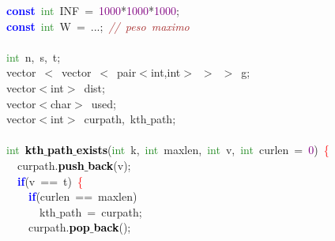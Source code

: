 {\ttfamily \raggedright {
\noindent
\mbox{}\textbf{\textcolor{Blue}{const}}\ \textcolor{ForestGreen}{int}\ INF\ \textcolor{BrickRed}{=}\ \textcolor{Purple}{1000}\textcolor{BrickRed}{*}\textcolor{Purple}{1000}\textcolor{BrickRed}{*}\textcolor{Purple}{1000}\textcolor{BrickRed}{;} \\
\mbox{}\textbf{\textcolor{Blue}{const}}\ \textcolor{ForestGreen}{int}\ W\ \textcolor{BrickRed}{=}\ \textcolor{BrickRed}{...;}\ \textit{\textcolor{Brown}{//\ peso\ maximo}} \\
\mbox{} \\
\mbox{}\textcolor{ForestGreen}{int}\ n\textcolor{BrickRed}{,}\ s\textcolor{BrickRed}{,}\ t\textcolor{BrickRed}{;} \\
\mbox{}vector\ \textcolor{BrickRed}{$<$}\ vector\ \textcolor{BrickRed}{$<$}\ \textcolor{TealBlue}{pair$<$int,int$>$\ $>$\ $>$}\ g\textcolor{BrickRed}{;} \\
\mbox{}\textcolor{TealBlue}{vector$<$int$>$}\ dist\textcolor{BrickRed}{;} \\
\mbox{}\textcolor{TealBlue}{vector$<$char$>$}\ used\textcolor{BrickRed}{;} \\
\mbox{}\textcolor{TealBlue}{vector$<$int$>$}\ curpath\textcolor{BrickRed}{,}\ kth$\_$path\textcolor{BrickRed}{;} \\
\mbox{} \\
\mbox{}\textcolor{ForestGreen}{int}\ \textbf{\textcolor{Black}{kth$\_$path$\_$exists}}\textcolor{BrickRed}{(}\textcolor{ForestGreen}{int}\ k\textcolor{BrickRed}{,}\ \textcolor{ForestGreen}{int}\ maxlen\textcolor{BrickRed}{,}\ \textcolor{ForestGreen}{int}\ v\textcolor{BrickRed}{,}\ \textcolor{ForestGreen}{int}\ curlen\ \textcolor{BrickRed}{=}\ \textcolor{Purple}{0}\textcolor{BrickRed}{)}\ \textcolor{Red}{\{} \\
\mbox{}\ \ curpath\textcolor{BrickRed}{.}\textbf{\textcolor{Black}{push$\_$back}}\textcolor{BrickRed}{(}v\textcolor{BrickRed}{);} \\
\mbox{}\ \ \textbf{\textcolor{Blue}{if}}\textcolor{BrickRed}{(}v\ \textcolor{BrickRed}{==}\ t\textcolor{BrickRed}{)}\ \textcolor{Red}{\{} \\
\mbox{}\ \ \ \ \textbf{\textcolor{Blue}{if}}\textcolor{BrickRed}{(}curlen\ \textcolor{BrickRed}{==}\ maxlen\textcolor{BrickRed}{)} \\
\mbox{}\ \ \ \ \ \ kth$\_$path\ \textcolor{BrickRed}{=}\ curpath\textcolor{BrickRed}{;} \\
\mbox{}\ \ \ \ curpath\textcolor{BrickRed}{.}\textbf{\textcolor{Black}{pop$\_$back}}\textcolor{BrickRed}{();} \\
}}
